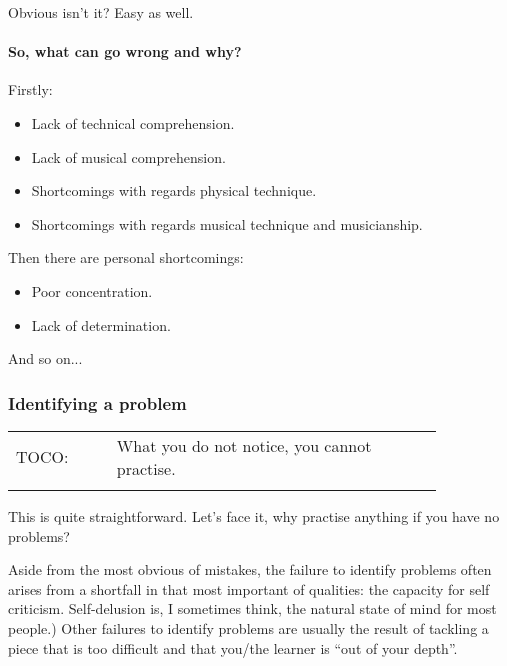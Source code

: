 \documentclass{article}
\begin{document}
Obvious isn't it?
Easy as well.

\paragraph{So, what can go wrong and why?}

Firstly:

\begin{itemize}
    \item Lack of technical comprehension.
    \item Lack of musical comprehension.
    \item Shortcomings with regards physical technique.
    \item Shortcomings with regards musical technique and musicianship.
\end{itemize}

Then there are personal shortcomings:

\begin{itemize}
    \item Poor concentration.
    \item Lack of determination.
\end{itemize}

And so on...

\subsubsection{Identifying a problem}

\begin{tabular}{p{0.2\linewidth}p{0.65\linewidth}}
    \\
    TOCO: & What you do not notice, you cannot practise.\\
    \\
\end{tabular}

This is quite straightforward.
Let's face it, why practise anything if you have no problems?

Aside from the most obvious of mistakes, the failure to identify problems often arises from a shortfall in that most important of qualities: the capacity for self criticism.
Self-delusion is, I sometimes think, the natural state of mind for most people.)\footnotemark
Other failures to identify problems are usually the result of tackling a piece that is too difficult and that you/the learner is ``out of your depth''.\footnotemark
\end{document}
